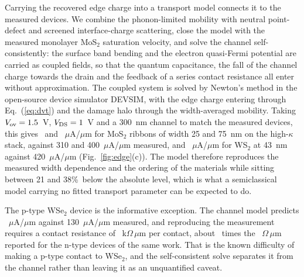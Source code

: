 \documentclass[aip,apl,amsmath,amssymb,reprint,longbibliography]{revtex4-1}
\begin{document}
Carrying the recovered edge charge into a transport model connects it to the
measured devices. We combine the phonon-limited mobility with neutral
point-defect and screened interface-charge scattering, close the model with the
measured monolayer MoS$_2$ saturation velocity,\cite{Smithe2018} and solve the
channel self-consistently: the surface band bending and the electron
quasi-Fermi potential are carried as coupled fields, so that the quantum
capacitance, the fall of the channel charge towards the drain and the feedback
of a series contact resistance all enter without approximation. The coupled
system is solved by Newton's method in the open-source device simulator
DEVSIM,\cite{Sanchez2022} with the edge charge entering through
Eq.~(\ref{eq:dvt}) and the damage halo through the width-averaged mobility.
Taking $V_{\rm ov}=1.5$~V, $V_{\rm DS}=1$~V and a 300~nm channel to match the
measured devices, this gives \IonScMoSTwentyfive\ and
\IonScMoSSeventyfive~$\mu$A/$\mu$m for MoS$_2$ ribbons of width 25 and 75~nm on
the high-$\kappa$ stack, against 310 and 400~$\mu$A/$\mu$m measured, and
\IonScWSTwo~$\mu$A/$\mu$m for WS$_2$ at 43~nm against 420~$\mu$A/$\mu$m
(Fig.~\ref{fig:edge}(c)).\cite{Pena2026} The model therefore reproduces the
measured width dependence and the ordering of the materials while sitting
between 21 and 38\%\ below the absolute level, which is what a semiclassical
model carrying no fitted transport parameter can be expected to do.

The p-type WSe$_2$ device is the informative exception. The channel model
predicts \IonScWSeTwo~$\mu$A/$\mu$m against 130~$\mu$A/$\mu$m measured, and
reproducing the measurement requires a contact resistance of
\RcWSeTwo~k$\Omega\,\mu$m per contact, about \RcRatio\ times the
\RcMeas~$\Omega\,\mu$m reported for the n-type devices of the same
work.\cite{Pena2026} That is the
known difficulty of making a p-type contact to
WSe$_2$,\cite{Sun2026,Mondal2024} and the self-consistent solve separates it
from the channel rather than leaving it as an unquantified caveat.
\end{document}
